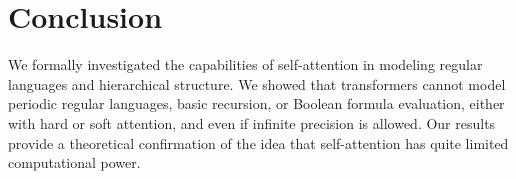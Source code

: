 \documentclass[11pt,a4paper]{article}
\begin{document}
\section{Conclusion}
We formally investigated the capabilities of self-attention in modeling regular languages and hierarchical structure.
We showed that transformers cannot model periodic regular languages, basic recursion, or Boolean formula evaluation, either with hard or soft attention, and even if infinite precision is allowed.
Our results provide a theoretical confirmation of the idea that self-attention has quite limited computational power. %




\end{document}
